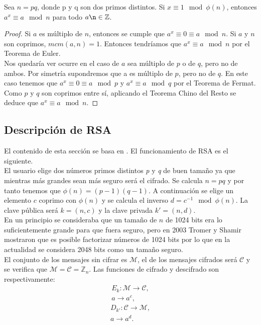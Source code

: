 \begin{proposicion}
	Sea $n = pq$, donde p y q son dos primos distintos. Si $x\equiv 1 \mod \phi(n)$, entonces $a^x\equiv a\mod n$ para todo $ a \n \in \mathbb{Z}$.
\end{proposicion}\vspace*{-10mm}
	\begin{proof}
		Si $a$ es múltiplo de $n$, entonces se cumple que $a^x \equiv 0 \equiv a \mod n$. Si $a$ y $n$ son coprimos, $mcm(a,n) = 1$. Entonces tendríamos que $a^x \equiv a \mod n$ por el Teorema de Euler.\\
		Nos quedaría ver ocurre en el caso de $a$ sea múltiplo de $p$ o de $q$, pero no de ambos. Por simetría supondremos que a es múltiplo de $p$, pero no de $q$. En este caso tenemos que $a^x \equiv 0 \equiv a \mod p$  y $a^x \equiv a \mod q$ por el Teorema de Fermat. Como $p$ y $q$ son coprimos entre sí, aplicando el Teorema Chino del Resto se deduce que $a^x \equiv a \mod n$.
	\end{proof}

\subsection{Descripción de RSA}
El contenido de esta sección se basa en \cite{angelRiosMateos}. El funcionamiento de RSA es el siguiente.\\
El usuario elige dos números primos distintos \emph{p} y \emph{q} de buen tamaño ya que mientras más grandes sean más seguro será el cifrado.
Se calcula $n = pq$ y por tanto tenemos que $\phi(n) = (p-1)(q-1)$. A continuación se elige un elemento $c$ coprimo con $\phi(n)$ y se calcula el inverso $d = c^{-1}\mod \phi(n)$. La clave pública será $k=(n,c)$ y la clave privada $k'=(n,d)$.\\
En un principio se consideraba que un tamaño de $n$ de 1024 bits era lo suficientemente grande para que fuera seguro, pero en 2003 Tromer y Shamir mostraron que es posible factorizar números de 1024 bits \cite{1024RSA} por lo que en la actualidad se considera 2048 bits como un tamaño seguro.\\
El conjunto de los mensajes sin cifrar es $\mathcal{M}$, el de los mensajes cifrados será $\mathcal{C}$ y se verifica que $\mathcal{M} = \mathcal{C} = \mathbb{Z}_n$. Las funciones de cifrado y descifrado son respectivamente:
\begin{align*}
	E_{k}:\mathcal{M}\rightarrow\mathcal{C},\\
	a \rightarrow a^c,
\end{align*}
\begin{align*}
	D_{k'}:\mathcal{C}\rightarrow\mathcal{M},\\
	a \rightarrow a^d.
\end{align*}

